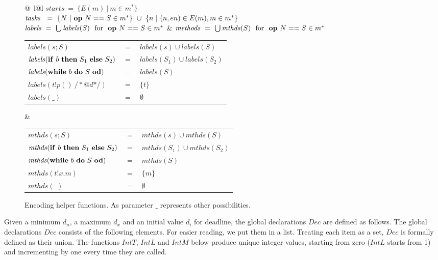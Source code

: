 \documentclass[copyright,creativecommons]{eptcs}
\theoremstyle{definition}
\newcommand{\id}[1]{\mathit{#1}}
\begin{document}
\begin{figure}
\begin{center}

\begin{tabular}{@{~}l@{\hspace{-2cm}}l}
$\id{starts} ~=~ \{E(m) ~|~ m \in m^*\}$\\
$\id{tasks} ~~=~ \{N~|~\id{\bf op} ~N == S \in m^*\} ~ \cup ~ \{n ~|~ (n,en) \in E(m), m \in m^*\}$\\[6pt]

$\id{labels} ~=~ \bigcup \id{labels}(S) \mbox{~ for ~}\id{\bf op} ~N == S \in m^*$ &
$\id{methods} ~=~ \bigcup \id{mthds}(S) \mbox{~ for ~}\id{\bf op} ~N == S \in m^*$\\
{\small
\begin{tabular}{@{} l @{~} c @{~} l}
$\id{labels}(s;S) $&$=$&$ \id{labels}(s) \cup \id{labels}(S) $\\
$\id{labels}( \id{\bf if}\ b\ \id{\bf then}\ S_1\ \id{\bf else}\ S_2 ) $&$=$&$ \id{labels}(S_1) \cup \id{labels}(S_2)$\\
$\id{labels}(\id{\bf while}\ b\ \id{\bf do} ~S~ \id{\bf od} ) $&$=$&$ \id{labels}(S)$\\
$\id{labels}(t!p()~ \id{/*}\id{@d}\id{*/}) $&$=$&$ \{t\}$\\
$\id{labels}(\_) $&$=$&$ \emptyset$
\end{tabular}
}
&
{\small
\begin{tabular}{@{} l @{~} c @{~} l}
$\id{mthds}(s;S) $&$=$&$ \id{mthds}(s) \cup \id{mthds}(S) $\\
$\id{mthds}( \id{\bf if}\ b\ \id{\bf then}\ S_1\ \id{\bf else}\ S_2 ) $&$=$&$ \id{mthds}(S_1) \cup \id{mthds}(S_2)$\\
$\id{mthds}(\id{\bf while}\ b\ \id{\bf do} ~S~ \id{\bf od}) $&$=$&$ \id{mthds}(S)$\\
$\id{mthds}(t!x.m ) $&$=$&$ \{m\}$\\
$\id{mthds}(\_) $&$=$&$ \emptyset$
\end{tabular}
}
\end{tabular}

\end{center}
\caption{Encoding helper functions. As parameter $\_$ represents other possibilities.}\label{fig::helper}
\end{figure}


Given a minimum $d_n$, a maximum $d_x$ and an initial value $d_i$ for deadline,
the global declarations $Dec$ are defined as follows.
The global declarations $Dec$ consists of the following elements. For easier reading, we put them in a list. Treating each item as a set, $Dec$ is formally defined as their union.
The functions $\id{IntT}$, $\id{IntL}$ and $\id{IntM}$ below produce unique integer values, starting from zero ($\id{IntL}$ starts from 1) and incrementing by one every time they are called.
\end{document}
